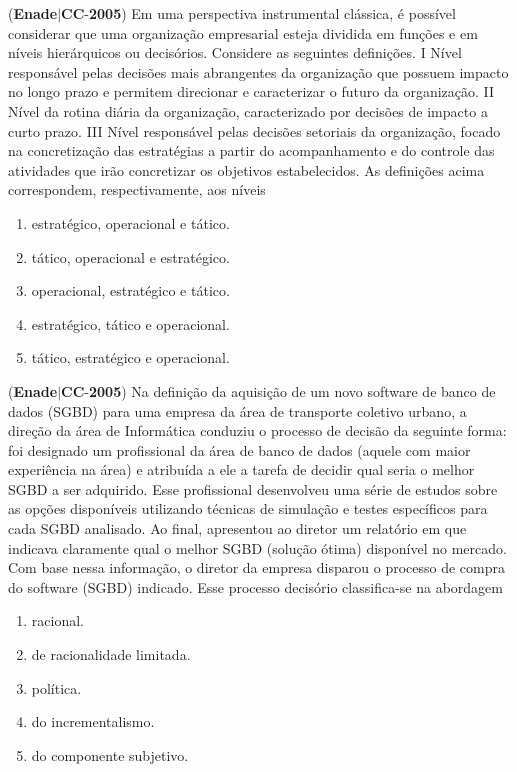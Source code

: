 \documentclass{exam}
\begin{document}
\begin{questions}
\question (\textbf{Enade}$|$\textbf{CC}-\textbf{2005}) Em uma perspectiva instrumental clássica, é possível considerar
que uma organização empresarial esteja dividida em funções e em
níveis hierárquicos ou decisórios. Considere as seguintes
definições.
I Nível responsável pelas decisões mais abrangentes da
organização que possuem impacto no longo prazo e permitem
direcionar e caracterizar o futuro da organização.
II Nível da rotina diária da organização, caracterizado por
decisões de impacto a curto prazo.
III Nível responsável pelas decisões setoriais da organização,
focado na concretização das estratégias a partir do
acompanhamento e do controle das atividades que irão
concretizar os objetivos estabelecidos.
As definições acima correspondem, respectivamente, aos níveis
	\begin{enumerate}[label=\alph*)]
		\item  estratégico, operacional e tático.
		\item  tático, operacional e estratégico.
		\item  operacional, estratégico e tático.
		\item  estratégico, tático e operacional.
		\item  tático, estratégico e operacional.

	\end{enumerate}

\question (\textbf{Enade}$|$\textbf{CC}-\textbf{2005}) Na definição da aquisição de um novo software de
banco de dados (SGBD) para uma empresa da área de
transporte coletivo urbano, a direção da área de Informática
conduziu o processo de decisão da seguinte forma: foi
designado um profissional da área de banco de dados (aquele
com maior experiência na área) e atribuída a ele a tarefa de
decidir qual seria o melhor SGBD a ser adquirido. Esse
profissional desenvolveu uma série de estudos sobre as opções
disponíveis utilizando técnicas de simulação e testes específicos
para cada SGBD analisado. Ao final, apresentou ao diretor
um relatório em que indicava claramente qual o melhor SGBD
(solução ótima) disponível no mercado. Com base nessa
informação, o diretor da empresa disparou o processo de
compra do software (SGBD) indicado.
Esse processo decisório classifica-se na abordagem
	\begin{enumerate}[label=\alph*)]
		\item  racional.
		\item  de racionalidade limitada.
		\item  política.
		\item  do incrementalismo.
		\item  do componente subjetivo.


\end{enumerate}
\end{questions}
\end{document}
